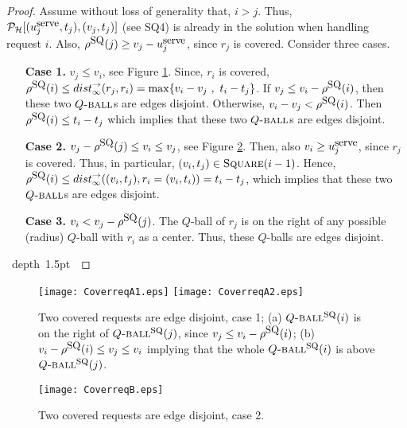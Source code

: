 \documentclass[11pt]{article}
\def\blackslug{\hbox{\hskip 1pt \vrule width 4pt height 8pt
    depth 1.5pt \hskip 1pt}}
\def\QED{\quad\blackslug\lower 8.5pt\null\par}
\newcommand{\calH}{\mathcal{H}}
\newcommand{\calP}{\mathcal{P}}
\newcommand{\Square}[0]{\mbox{\sc Square}}
\newcommand{\distinf}[1]{{dist}^{\rightarrow}_{\infty}(#1)}
\newcommand{\uSQ}{u^{\mbox{\small\upshape serve}}}
\newcommand{\rhoSQ}[0]{\rho^{\mbox{\small\upshape SQ}}}
\newcommand{\SQball}[0]{Q{\mbox{\sc -ball}}^{\mbox{\sc sq}}}
\newcommand{\Qball}[0]{Q{\mbox{\sc -ball}}}
\begin{document}
\begin{proof}
Assume without loss of generality that, $i>j$.
Thus, $\calP_\calH[(\uSQ_j,t_j),(v_j,t_j)]$ (see SQ4) is already in the solution when handling request $i$.
Also, $\rhoSQ(j) \geq v_j-\uSQ_j$, since $r_j$ is covered.
Consider three cases.


\begin{itemize}
\item[{\bf Case 1.}]
  $v_j\leq v_i$, see Figure \ref{fig:Square: covered requests case 1}.
Since, $r_i$ is covered, $\rhoSQ(i)\leq\distinf{r_j,r_i}=\max\{v_i-v_j ~,~ t_i-t_j\}$.
If $v_j\leq v_i-\rhoSQ(i)$, then these two $\Qball$s are edges disjoint.
Otherwise, $v_i-v_j < \rhoSQ(i)$.
Then $\rhoSQ(i)\leq t_i-t_j$ which implies that these two $\Qball$s are edges disjoint.


\item[{\bf Case 2.}] $v_j-\rhoSQ(j)\leq v_i\leq v_j$, see Figure \ref{fig:Square: covered requests case 2}.
Then, also $v_i\geq \uSQ_j$, since $r_j$ is covered.
Thus, in particular, $(v_i,t_j)\in\Square(i-1)$.
Hence, $\rhoSQ(i)\leq\distinf{(v_i,t_j),r_i=(v_i,t_i)} = t_i-t_j$, which implies that these two $\Qball$s are edges disjoint.


\item[{\bf Case 3.}] $v_i<v_j-\rhoSQ(j)$.
The $Q$-ball of $r_j$ is on the right of any possible (radius) $Q$-ball with $r_i$ as a center.
Thus, these $Q$-balls are edges disjoint.

\end{itemize}
\QED
\end{proof}



\begin{figure}[ht]
\begin{center}
\texttt{[image: CoverreqA1.eps]}
\hfill
\texttt{[image: CoverreqA2.eps]}
\end{center}
\caption{\sf Two covered requests are edge disjoint, case 1; (a) $\SQball(i)$ is on the right of $\SQball(j)$, since $v_j\leq v_i-\rhoSQ(i)$;
(b) $v_i-\rhoSQ(i)\leq v_j \leq v_i$ implying that the whole $\SQball(i)$ is above $\SQball(j)$.
\label{fig:Square: covered requests case 1}
}
\end{figure}
\begin{figure}[ht]
\begin{center}
\texttt{[image: CoverreqB.eps]}
\end{center}
\caption{\sf
Two covered requests are edge disjoint, case 2.
\label{fig:Square: covered requests case 2}
}
\end{figure}
\end{document}
